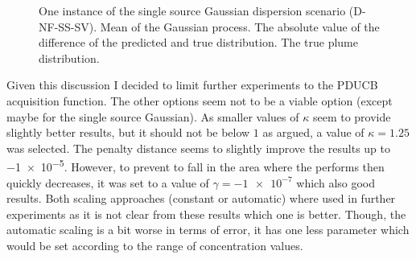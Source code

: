 \begin{figure}
    \centering
    \caption[Example visualization of the plume prediction]{One instance of the 
        single source Gaussian dispersion scenario (D-NF-SS-SV).  
         Mean of the Gaussian process.  
         The absolute value of the difference of the 
        predicted and true distribution.   The true plume 
        distribution.}\label{fig:plume}
\end{figure}

Given this discussion I decided to limit further experiments to the PDUCB 
acquisition function. The other options seem not to be a viable option (except 
maybe for the single source Gaussian). As smaller values of $\kappa$ seem to 
provide slightly better results, but it should not be below $1$ as argued, 
a value of $\kappa = 1.25$ was selected. The penalty distance seems to slightly 
improve the results up to \num{-1e-5}. However, to prevent to fall in the area 
where the performs then quickly decreases, it was set to a value of $\gamma 
= \num{-1e-7}$ which also good results. Both scaling approaches (constant or 
automatic) where used in further experiments as it is not clear from these 
results which one is better. Though, the automatic scaling is a bit worse in 
terms of error, it has one less parameter which would be set according to the 
range of concentration values.

